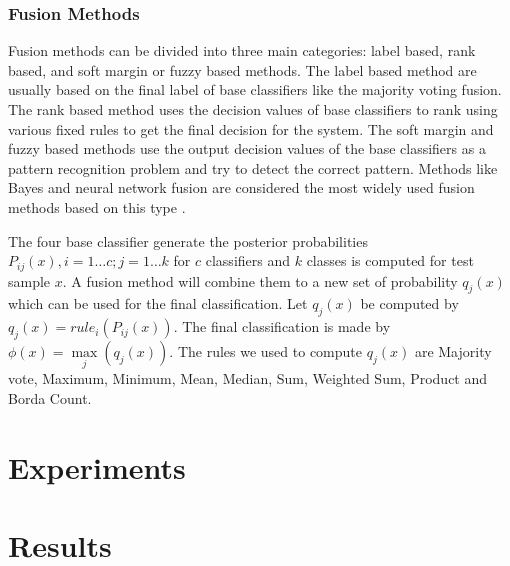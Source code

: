 \documentclass[conference]{IEEEtran}
\begin{document}
\subsubsection{Fusion Methods}
Fusion methods can be divided into three main categories: label based, rank based, and soft margin or fuzzy based methods. The label based method are usually based on the final label of base classifiers like the majority voting fusion. The rank based method uses the decision values of base classifiers to rank using various fixed rules to get the final decision for the system. The soft margin and fuzzy based methods use the output decision values of the base classifiers as a pattern recognition problem and try to detect the correct pattern. Methods like Bayes and neural network fusion are considered the most widely used fusion methods based on this type  \cite{Farah2005,Ruta2000,Denoeux2000}.




The four base classifier generate the posterior probabilities $P_{ij}(x), i = 1\dots c; j = 1\dots k$ for $c$ classifiers and $k$ classes is computed for test sample $x$. A fusion method will  combine them to a new set of probability  $q_j(x)$ which can be used for the final classification. Let $q_j(x)$ be computed by $q_j(x)=rule_i\left(P_{ij}(x)\right)$. The final classification is made by $\phi(x)=\max\limits_j(q_j(x))$. The rules we used to compute $q_j(x)$ are Majority vote, Maximum, Minimum, Mean, Median, Sum, Weighted Sum, Product and Borda Count. %

\section{Experiments}
\section {Results}



\end{document}
